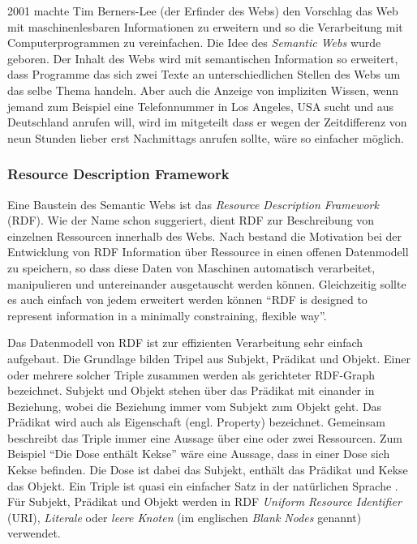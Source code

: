2001 machte Tim Berners-Lee (der Erfinder des Webs) den Vorschlag \cite{Berners-Lee2001} das Web mit maschinenlesbaren Informationen zu erweitern und so die Verarbeitung mit Computerprogrammen zu vereinfachen. Die Idee des \emph{Semantic Webs} wurde geboren. Der Inhalt des Webs wird mit semantischen Information so erweitert, dass Programme das sich zwei Texte an unterschiedlichen Stellen des Webs um das selbe Thema handeln. Aber auch die Anzeige von impliziten Wissen, wenn jemand zum Beispiel eine Telefonnummer in Los Angeles, USA sucht und aus Deutschland anrufen will, wird im mitgeteilt dass er wegen der Zeitdifferenz von neun Stunden lieber erst Nachmittags anrufen sollte, wäre so einfacher möglich.

\subsubsection{Resource Description Framework} %
\label{ssub:resource_description_framework}

Eine Baustein des Semantic Webs ist das \emph{Resource Description Framework} (RDF). Wie der Name schon suggeriert, dient RDF zur Beschreibung von einzelnen Ressourcen innerhalb des Webs. Nach \cite{Klyne2004,Manola2004} bestand die Motivation bei der Entwicklung von RDF Information über Ressource in einen offenen Datenmodell zu speichern, so dass diese Daten von Maschinen automatisch verarbeitet, manipulieren und untereinander ausgetauscht werden können. Gleichzeitig sollte es auch einfach von jedem erweitert werden können \enquote{RDF is designed to represent information in a minimally constraining, flexible way}\cite{Klyne2004}.

Das Datenmodell von RDF ist zur effizienten Verarbeitung sehr einfach aufgebaut. Die Grundlage bilden Tripel aus Subjekt, Prädikat und Objekt. Einer oder mehrere solcher Triple zusammen werden als gerichteter RDF-Graph bezeichnet. Subjekt und Objekt stehen über das Prädikat mit einander in Beziehung, wobei die Beziehung immer vom Subjekt zum Objekt geht. Das Prädikat wird auch als Eigenschaft (engl. Property) bezeichnet. Gemeinsam beschreibt das Triple immer eine Aussage über eine oder zwei Ressourcen. Zum Beispiel \enquote{Die Dose enthält Kekse} wäre eine Aussage, dass in einer Dose sich Kekse befinden. Die Dose ist dabei das Subjekt, enthält das Prädikat und Kekse das Objekt. Ein Triple ist quasi ein einfacher Satz in der natürlichen Sprache \cite{Heinzen}. Für Subjekt, Prädikat und Objekt werden in RDF \emph{Uniform Resource Identifier} (URI), \emph{Literale} oder \emph{leere Knoten} (im englischen \emph{Blank Nodes} genannt) verwendet. 

